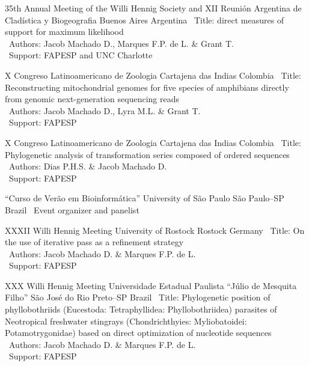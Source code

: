 \documentclass[11pt, letterpaper, sans]{moderncv}
\begin{document}
\vspace{.5em}

\cventry{---}
	{35th Annual Meeting of the Willi Hennig Society and XII Reunión Argentina de Cladística y Biogeografia}
	{Buenos Aires}
	{Argentina}
	{}
	{
		\textbullet~Title: direct measures of support for maximum likelihood\\
		\textbullet~Authors: Jacob Machado D., Marques F.P. de L. \& Grant T.\\
		\textbullet~Support: FAPESP and UNC Charlotte
	}

\vspace{.5em}

	{X Congreso Latinoamericano de Zoologia}
	{Cartajena das Indias}
	{Colombia}
	{}
	{
		\textbullet~Title: Reconstructing mitochondrial genomes for five species of amphibians directly from genomic next-generation sequencing reads\\
		\textbullet~Authors: Jacob Machado D., Lyra M.L. \& Grant T.\\
		\textbullet~Support: FAPESP
	}

\vspace{.5em}

\cventry{---}
	{X Congreso Latinoamericano de Zoologia}
	{Cartajena das Indias}
	{Colombia}
	{}
	{
		\textbullet~Title: Phylogenetic analysis of transformation series composed of ordered sequences\\
		\textbullet~Authors: Dias P.H.S. \& Jacob Machado D.\\
		\textbullet~Support: FAPESP
	}

\vspace{.5em}

\cventry{---}
	{``Curso de Verão em Bioinformática''}
	{University of São Paulo}
	{São Paulo--SP}
	{Brazil}
	{
		\textbullet~Event organizer and panelist
	}

\vspace{.5em}

	{XXXII Willi Hennig Meeting}
	{University of Rostock}
	{Rostock}
	{Germany}
	{
		\textbullet~Title: On the use of iterative pass as a refinement strategy\\
		\textbullet~Authors: Jacob Machado D. \& Marques F.P. de L.\\
		\textbullet~Support: FAPESP
	}

\vspace{.5em}

	{XXX Willi Hennig Meeting}
	{Universidade Estadual Paulista ``Júlio de Mesquita Filho''}
	{São José do Rio Preto--SP}
	{Brazil}
	{
		\textbullet~Title: Phylogenetic position of phyllobothriids (Eucestoda: Tetraphyllidea: Phyllobothriidea) parasites of Neotropical freshwater stingrays (Chondrichthyies: Myliobatoidei: Potamotrygonidae) based on direct optimization of nucleotide sequences\\
		\textbullet~Authors: Jacob Machado D. \& Marques F.P. de L.\\
		\textbullet~Support: FAPESP
	}
\end{document}
